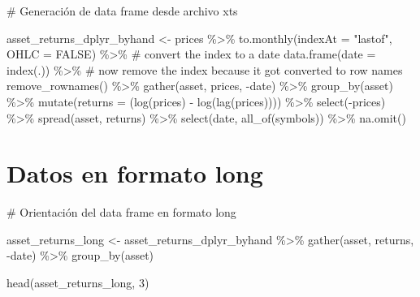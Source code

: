 \documentclass[
  letterpaper,
  DIV=11,
  numbers=noendperiod]{scrartcl}
\newenvironment{Shaded}{\begin{snugshade}}{\end{snugshade}}
\newcommand{\AttributeTok}[1]{\textcolor[rgb]{0.40,0.45,0.13}{#1}}
\newcommand{\CommentTok}[1]{\textcolor[rgb]{0.37,0.37,0.37}{#1}}
\newcommand{\ConstantTok}[1]{\textcolor[rgb]{0.56,0.35,0.01}{#1}}
\newcommand{\DecValTok}[1]{\textcolor[rgb]{0.68,0.00,0.00}{#1}}
\newcommand{\FunctionTok}[1]{\textcolor[rgb]{0.28,0.35,0.67}{#1}}
\newcommand{\NormalTok}[1]{\textcolor[rgb]{0.00,0.23,0.31}{#1}}
\newcommand{\OtherTok}[1]{\textcolor[rgb]{0.00,0.23,0.31}{#1}}
\newcommand{\SpecialCharTok}[1]{\textcolor[rgb]{0.37,0.37,0.37}{#1}}
\newcommand{\StringTok}[1]{\textcolor[rgb]{0.13,0.47,0.30}{#1}}
\begin{document}
\begin{Shaded}
\begin{Highlighting}[]
\CommentTok{\# Generación de data frame desde archivo xts}

\NormalTok{asset\_returns\_dplyr\_byhand }\OtherTok{\textless{}{-}}
\NormalTok{  prices }\SpecialCharTok{\%\textgreater{}\%}
  \FunctionTok{to.monthly}\NormalTok{(}\AttributeTok{indexAt =} \StringTok{"lastof"}\NormalTok{, }\AttributeTok{OHLC =} \ConstantTok{FALSE}\NormalTok{) }\SpecialCharTok{\%\textgreater{}\%}
  \CommentTok{\# convert the index to a date}
  \FunctionTok{data.frame}\NormalTok{(}\AttributeTok{date =} \FunctionTok{index}\NormalTok{(.)) }\SpecialCharTok{\%\textgreater{}\%}
  \CommentTok{\# now remove the index because it got converted to row names}
  \FunctionTok{remove\_rownames}\NormalTok{() }\SpecialCharTok{\%\textgreater{}\%}
  \FunctionTok{gather}\NormalTok{(asset, prices, }\SpecialCharTok{{-}}\NormalTok{date) }\SpecialCharTok{\%\textgreater{}\%}
  \FunctionTok{group\_by}\NormalTok{(asset) }\SpecialCharTok{\%\textgreater{}\%}
  \FunctionTok{mutate}\NormalTok{(}\AttributeTok{returns =}\NormalTok{ (}\FunctionTok{log}\NormalTok{(prices) }\SpecialCharTok{{-}} \FunctionTok{log}\NormalTok{(}\FunctionTok{lag}\NormalTok{(prices)))) }\SpecialCharTok{\%\textgreater{}\%}
  \FunctionTok{select}\NormalTok{(}\SpecialCharTok{{-}}\NormalTok{prices) }\SpecialCharTok{\%\textgreater{}\%}
  \FunctionTok{spread}\NormalTok{(asset, returns) }\SpecialCharTok{\%\textgreater{}\%}
  \FunctionTok{select}\NormalTok{(date, }\FunctionTok{all\_of}\NormalTok{(symbols)) }\SpecialCharTok{\%\textgreater{}\%} 
  \FunctionTok{na.omit}\NormalTok{()}
\end{Highlighting}
\end{Shaded}

\section{Datos en formato long}\label{datos-en-formato-long}

\begin{Shaded}
\begin{Highlighting}[]
\CommentTok{\# Orientación del data frame en formato long}

\NormalTok{asset\_returns\_long }\OtherTok{\textless{}{-}}
\NormalTok{  asset\_returns\_dplyr\_byhand }\SpecialCharTok{\%\textgreater{}\%}
  \FunctionTok{gather}\NormalTok{(asset, returns, }\SpecialCharTok{{-}}\NormalTok{date) }\SpecialCharTok{\%\textgreater{}\%}
  \FunctionTok{group\_by}\NormalTok{(asset)}

\FunctionTok{head}\NormalTok{(asset\_returns\_long, }\DecValTok{3}\NormalTok{)}
\end{Highlighting}
\end{Shaded}
\end{document}
